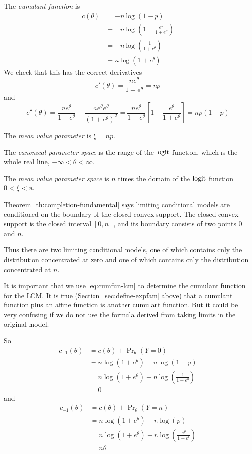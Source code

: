The \emph{cumulant function} is
\begin{align*}
   c(\theta)
   & =
   - n \log(1 - p)
   \\
   & =
   - n \log\left(1 - \frac{e^\theta}{1 + e^\theta}\right)
   \\
   & =
   - n \log\left(\frac{1}{1 + e^\theta}\right)
   \\
   & =
   n \log\left(1 + e^\theta\right)
\end{align*}
We check that this has the correct derivatives
$$
   c'(\theta) = \frac{n e^\theta}{1 + e^\theta} = n p
$$
and
$$
   c''(\theta)
   =
   \frac{n e^\theta}{1 + e^\theta}
   - \frac{n e^\theta e^\theta}{(1 + e^\theta)^2}
   =
   \frac{n e^\theta}{1 + e^\theta}
   \left[ 1 - \frac{e^\theta}{1 + e^\theta} \right]
   =
   n p (1 - p)
$$

The \emph{mean value parameter} is $\xi = n p$.

The \emph{canonical parameter space} is the range of the $\operatorname{logit}$ function,
which is the whole real line, $- \infty < \theta < \infty$.

The \emph{mean value parameter space} is $n$ times the domain
of the $\operatorname{logit}$ function $0 < \xi < n$.

Theorem~\ref{th:completion-fundamental} says limiting conditional models
are conditioned on the boundary of the closed convex support.
The closed convex support is the closed interval $[0, n]$, and its
boundary consists of two points $0$ and $n$.

Thus there are two limiting conditional models, one of which contains only
the distribution concentrated at zero and one of which contains only
the distribution concentrated at $n$.

It is important that we use \eqref{eq:cumfun-lcm} to determine the cumulant
function for the LCM.  It is true (Section~\ref{sec:define-expfam} above)
that a cumulant function plus an affine function is another cumulant function.
But it could be very confusing if we do not use the formula derived from
taking limits in the original model.

So
\begin{align*}
   c_{- 1}(\theta)
   & =
   c(\theta) + \Pr\nolimits_\theta(Y = 0)
   \\
   & =
   n \log\left(1 + e^\theta\right)
   +
   n \log (1 - p)
   \\
   & =
   n \log\left(1 + e^\theta\right)
   +
   n \log \left(\frac{1}{1 + e^\theta}\right)
   \\
   & =
   0
\end{align*}
and
\begin{align*}
   c_{+ 1}(\theta)
   & =
   c(\theta) + \Pr\nolimits_\theta(Y = n)
   \\
   & =
   n \log\left(1 + e^\theta\right)
   +
   n \log (p)
   \\
   & =
   n \log\left(1 + e^\theta\right)
   +
   n \log \left(\frac{e^\theta}{1 + e^\theta}\right)
   \\
   & =
   n \theta
\end{align*}

